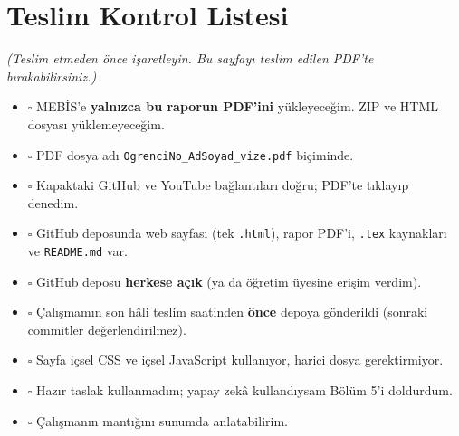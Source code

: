 \documentclass[12pt,a4paper]{article}
\newcommand{\aciklama}[1]{{\color{gray}\itshape (#1)}}
\begin{document}
\appendix
\section{Teslim Kontrol Listesi}
\aciklama{Teslim etmeden önce işaretleyin. Bu sayfayı teslim edilen PDF'te bırakabilirsiniz.}
\begin{itemize}[label={}]
  \item $\square$ MEBİS'e \textbf{yalnızca bu raporun PDF'ini} yükleyeceğim. ZIP ve HTML dosyası yüklemeyeceğim.
  \item $\square$ PDF dosya adı \texttt{OgrenciNo\_AdSoyad\_vize.pdf} biçiminde.
  \item $\square$ Kapaktaki GitHub ve YouTube bağlantıları doğru; PDF'te tıklayıp denedim.
  \item $\square$ GitHub deposunda web sayfası (tek \texttt{.html}), rapor PDF'i, \texttt{.tex} kaynakları ve \texttt{README.md} var.
  \item $\square$ GitHub deposu \textbf{herkese açık} (ya da öğretim üyesine erişim verdim).
  \item $\square$ Çalışmamın son hâli teslim saatinden \textbf{önce} depoya gönderildi (sonraki commitler değerlendirilmez).
  \item $\square$ Sayfa içsel CSS ve içsel JavaScript kullanıyor, harici dosya gerektirmiyor.
  \item $\square$ Hazır taslak kullanmadım; yapay zekâ kullandıysam Bölüm 5'i doldurdum.
  \item $\square$ Çalışmanın mantığını sunumda anlatabilirim.
\end{itemize}
\end{document}
